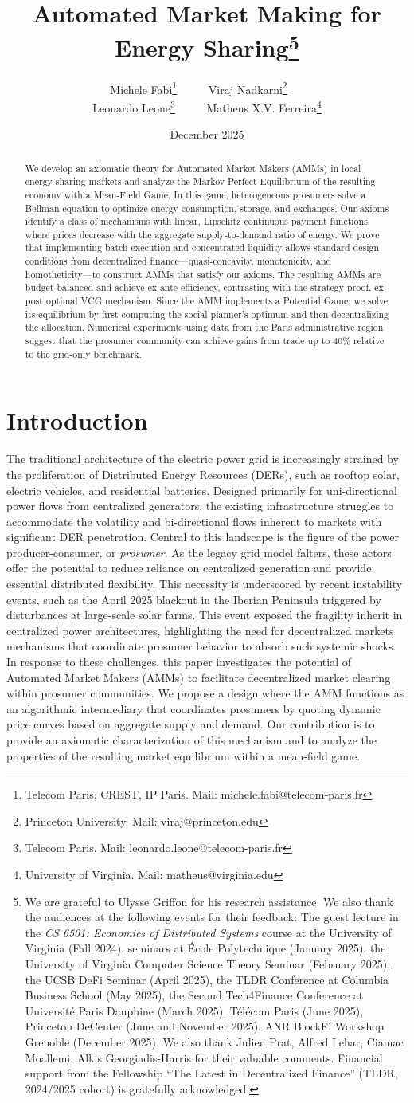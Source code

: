 \documentclass[12pt, notitlepage]{article}
\title{Automated Market Making for Energy Sharing\protect\thanks{
We are grateful to Ulysse Griffon for his research assistance. We also thank the audiences at the following events for their feedback: The guest lecture in the \textit{CS 6501: Economics of Distributed Systems} course at the University of Virginia (Fall 2024), seminars at École Polytechnique (January 2025), the University of Virginia Computer Science Theory Seminar (February 2025), the UCSB DeFi Seminar (April 2025), the TLDR Conference at Columbia Business School (May 2025), the Second Tech4Finance Conference at Université Paris Dauphine (March 2025), Télécom Paris (June 2025), Princeton DeCenter (June and November 2025), ANR BlockFi Workshop Grenoble (December 2025). We also thank Julien Prat, Alfred Lehar, Ciamac Moallemi, Alkis Georgiadis-Harris for their valuable comments. Financial support from the Fellowship “The Latest in Decentralized Finance” (TLDR, 2024/2025 cohort) is gratefully acknowledged.
}}
\author{Michele Fabi\protect\footnote{Telecom Paris, CREST, IP Paris. Mail: michele.fabi@telecom-paris.fr} \ \ \,  \ \ Viraj Nadkarni\protect\footnote{Princeton University. Mail: viraj@princeton.edu} \ \ \, \\ Leonardo Leone\protect\footnote{Telecom Paris. Mail: leonardo.leone@telecom-paris.fr} \ \ \, \ \ Matheus X.V. Ferreira\protect\footnote{University of Virginia. Mail: matheus@virginia.edu} }
\date{\bigskip December 2025}
\begin{document}
	
\maketitle
 \begin{abstract}
We develop an axiomatic theory for Automated Market Makers (AMMs) in local energy sharing markets and analyze the Markov Perfect Equilibrium of the resulting economy with a Mean-Field Game. In this game, heterogeneous prosumers solve a Bellman equation to optimize energy consumption, storage, and exchanges. Our axioms identify a class of mechanisms with linear, Lipschitz continuous payment functions, where prices decrease with the aggregate supply-to-demand ratio of energy. We prove that implementing batch execution and concentrated liquidity allows standard design conditions from decentralized finance—quasi-concavity, monotonicity, and homotheticity—to construct AMMs that satisfy our axioms. The resulting AMMs are budget-balanced and achieve ex-ante efficiency, contrasting with the strategy-proof, ex-post optimal VCG mechanism. Since the AMM implements a Potential Game, we solve its equilibrium by first computing the social planner's optimum and then decentralizing the allocation. Numerical experiments using data from the Paris administrative region suggest that the prosumer community can achieve gains from trade up to 40\% relative to the grid-only benchmark.
\end{abstract}

\section{Introduction}
The traditional architecture of the electric power grid is increasingly strained by the proliferation of Distributed Energy Resources (DERs), such as rooftop solar, electric vehicles, and residential batteries.
Designed primarily for uni-directional power flows from centralized generators, the existing infrastructure struggles to accommodate the volatility and bi-directional flows inherent to markets with significant DER penetration.
Central to this landscape is the figure of the power producer-consumer, or \textit{prosumer}.
As the legacy grid model falters, these actors offer the potential to reduce reliance on centralized generation and provide essential distributed flexibility.
This necessity is underscored by recent instability events, such as the April 2025 blackout in the Iberian Peninsula \citep{entsoe2025blackout} triggered by disturbances at large-scale solar farms.
This event exposed the fragility inherit in centralized power architectures, highlighting the need for decentralized markets mechanisms that coordinate prosumer behavior to absorb such systemic shocks.
In response to these challenges, this paper investigates the potential of Automated Market Makers (AMMs) to facilitate decentralized market clearing within prosumer communities.
We propose a design where the AMM functions as an algorithmic intermediary that coordinates prosumers by quoting dynamic price curves based on aggregate supply and demand.
Our contribution is to provide an axiomatic characterization of this mechanism and to analyze the properties of the resulting market equilibrium within a mean-field game.
\end{document}
